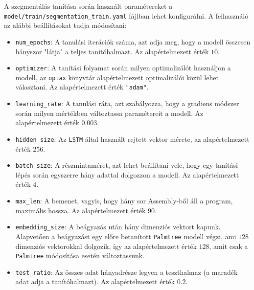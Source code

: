 A szegmentálás tanítása során használt paramétereket
a \texttt{model/train/segmentation\_train.yaml} fájlban lehet konfigurálni.
A felhasználó az alábbi beállításokat tudja módosítani:
\begin{itemize}
    \item \texttt{num\_epochs}: A tanulási iterációk száma, azt adja meg, hogy
        a modell összesen hányszor "látja" a teljes tanítóhalmazt. Az
        alapértelmezett érték $10$.
    \item \texttt{optimizer}: A tanítási folyamat során milyen optimalizálót
        használjon a modell, az \texttt{optax}\cite{optax2020github} könyvtár
        alapértelmezett optimalizálói közül lehet választani. Az
        alapértelmezett érték \texttt{"adam"}\cite{adam}.
    \item \texttt{learning\_rate}: A tanulási ráta, azt szabályozza, hogy
    a gradiens módszer során milyen mértékben változtassa paramétereit
    a modell. Az alapértelmezett érték $0.003$.
    \item \texttt{hidden\_size}: Az \texttt{LSTM} által használt rejtett vektor
        mérete, az alapértelmezett érték $256$.
    \item \texttt{batch\_size}: A részmintaméret, azt lehet beállítani vele, hogy
        egy tanítási lépés során egyszerre hány adattal dolgozzon a modell. Az
        alapértelmezett érték $4$.
    \item \texttt{max\_len}: A bemenet, vagyis, hogy hány sor Assembly-ből áll
        a program, maximális hossza. Az alapértelmezett érték $90$.
    \item \texttt{embedding\_size}: A beágyazás után hány dimenziós vektort
        kapunk. Alapvetően a beágyazást egy előre betanított \texttt{Palmtree}\cite{palmtree}
        modell végzi, ami $128$ dimenziós vektorokkal dolgozik, így az
        alapértelmezett érték $128$, amit csak a \texttt{Palmtree} módosítása
        esetén változtassunk.
    \item \texttt{test\_ratio}: Az összes adat hányadrésze legyen a teszthalmaz
        (a maradék adat adja a tanítóhalmazt). Az alapértelmezett érték $0.2$.
\end{itemize}

